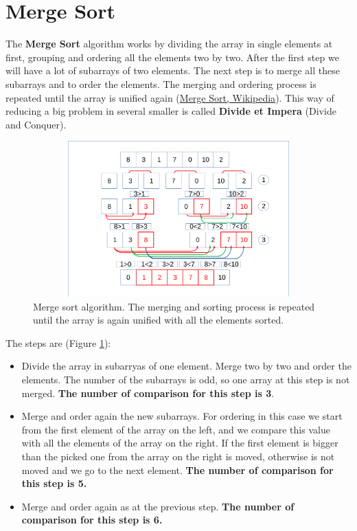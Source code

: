 \section{Merge Sort}
The \textbf{Merge Sort} algorithm works by dividing the array in single elements at first, grouping and ordering all the elements two by two. After the first step we will have a lot of subarrays of two elements. The next step is to merge all these subarrays and to order the elements. The merging and ordering process is repeated until the array is unified again \cite{wikimergesort} (\href{https://en.wikipedia.org/wiki/Merge_sort}{Merge Sort, Wikipedia}).  This way of reducing a big problem in several smaller is called \textbf{Divide et Impera} (Divide and Conquer).

\begin{figure}[hb]
	\includegraphics[width=14cm,height=6cm]{chapters/searchandsorting/images/sorting_6.pdf}
	\caption[]{Merge sort algorithm. The merging and sorting process is repeated until the array is again unified with all the elements sorted.}
	\label{sorting_6}
\end{figure}

The steps are (Figure \ref{sorting_6}): 
\begin{itemize}
\item[1] Divide the array in subarryas of one element. Merge two by two and order the elements. The number of the subarrays is odd, so one array at this step is not merged. \textbf{The number of comparison for this step is 3}.
\item[2] Merge and order again the new subarrays. For ordering in this case we start from the first element of the array on the left, and we compare this value with all the elements of the array on the right. If the first element is bigger than the picked one from the array on the right is moved, otherwise is not moved and we go to the next element. \textbf{The number of comparison for this step is 5.}   
\item[3] Merge and order again as at the previous step. \textbf{The number of comparison for this step is 6.}
\end{itemize}

